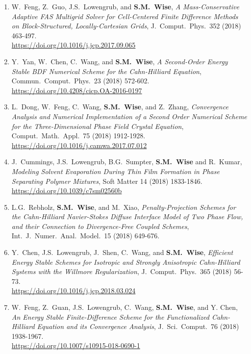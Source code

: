 \documentclass[11pt]{letter}
\begin{document}
\begin{enumerate}
	\item
W.~Feng, Z.~Guo, J.S.~Lowengrub, and \textbf{S.M.~Wise}, {\sl A Mass-Conservative Adaptive FAS Multigrid Solver for Cell-Centered Finite Difference Methods on Block-Structured, Locally-Cartesian Grids}, J.~Comput.~Phys.~352 (2018) 463-497.
	\\ 
\url{https://doi.org/10.1016/j.jcp.2017.09.065}

	\item
Y.~Yan, W.~Chen, C.~Wang, and \textbf{S.M.~Wise}, {\sl A Second-Order Energy Stable BDF Numerical Scheme for the Cahn-Hilliard Equation}, Commun.~Comput.~Phys.~23 (2018) 572-602.
	\\ 
\url{https://doi.org/10.4208/cicp.OA-2016-0197}


	\item
L.~Dong, W.~Feng, C.~Wang, \textbf{S.M.~Wise}, and Z.~Zhang, {\sl Convergence Analysis and Numerical Implementation of a Second Order Numerical Scheme for the Three-Dimensional Phase Field Crystal Equation}, Comput.~Math.~Appl.~75 (2018) 1912-1928.
	\\ 
\url{https://doi.org/10.1016/j.camwa.2017.07.012}

	\item
J.~Cummings, J.S.~Lowengrub, B.G.~Sumpter, \textbf{S.M.~Wise} and R.~Kumar, {\sl Modeling Solvent Evaporation During Thin Film Formation in Phase Separating Polymer Mixtures}, Soft Matter 14 (2018) 1833-1846.
	\\ 
\url{https://doi.org/10.1039/c7sm02560b}

	\item
L.G.~Rebholz, \textbf{S.M.~Wise}, and M.~Xiao, {\it Penalty-Projection Schemes for the Cahn-Hilliard Navier-Stokes Diffuse Interface Model of Two Phase Flow, and their Connection to Divergence-Free Coupled Schemes}, Int.~J.~Numer.~Anal.~Model.~15 (2018) 649-676.

	\item
Y.~Chen, J.S.~Lowengrub, J.~Shen, C.~Wang, and \textbf{S.M.~Wise}, {\sl Efficient Energy Stable Schemes for Isotropic and Strongly Anisotropic Cahn-Hilliard Systems with the Willmore Regularization}, J.~Comput.~Phys.~365 (2018) 56-73.
	\\
\url{https://doi.org/10.1016/j.jcp.2018.03.024}

	\item
W.~Feng, Z.~Guan, J.S.~Lowengrub, C.~Wang, \textbf{S.M.~Wise}, and Y. Chen, {\sl An Energy Stable Finite-Difference Scheme for the Functionalized Cahn-Hilliard Equation and its Convergence Analysis}, J.~Sci.~Comput.~76 (2018) 1938-1967.
	\\ 
\url{https://doi.org/10.1007/s10915-018-0690-1}


\end{enumerate}
\end{document}
